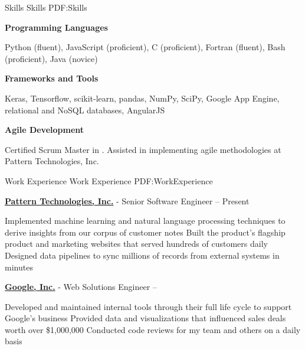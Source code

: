 \documentclass[letterpaper,MMMyyyy,nonstopmode]{simpleresumecv}
\begin{document}
\begin{Body}


\Section
{Skills}
{Skills}
{PDF:Skills}

\Entry
\textbf{Programming Languages}
\begin{Detail}
\Item Python (fluent), JavaScript (proficient), C (proficient), Fortran (fluent), Bash (proficient), Java (novice)
\end{Detail}

\BigGap
\Entry
\textbf{Frameworks and Tools}
\begin{Detail}
\Item Keras, Tensorflow, scikit-learn, pandas, NumPy, SciPy, Google App Engine, relational and NoSQL databases, AngularJS
\end{Detail}

\BigGap
\Entry
\textbf{Agile Development}
\begin{Detail}
\Item Certified Scrum Master in .  Assisted in implementing agile methodologies at Pattern Technologies, Inc.
\end{Detail}


\Section
{Work Experience}
{Work Experience}
{PDF:WorkExperience}

\Entry
\href {https://getpattern.com}{\textbf{Pattern Technologies, Inc.}}
-
Senior Software Engineer
\hfill
{} -- Present

\Gap
\begin{Detail}
\BulletItem
Implemented machine learning and natural language processing techniques to derive insights from our corpus of customer notes
\BulletItem
Built the product's flagship product and
marketing websites that served hundreds of customers daily
\BulletItem
Designed data pipelines to sync millions of records from external systems in minutes
\end{Detail}


\BigGap
\Entry
\href {https://google.com}{\textbf{Google, Inc.}}
-
Web Solutions Engineer
\hfill
{} -- 

\Gap
\begin{Detail}
\BulletItem
Developed and maintained internal tools through their full life cycle to support Google's business
\BulletItem
Provided data and visualizations that influenced sales deals worth over \$1,000,000
\BulletItem
Conducted code reviews for my team and others on a daily basis
\end{Detail}



\end{Body}
\end{document}
